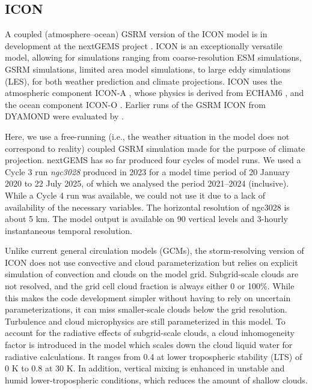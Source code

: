 \documentclass[12pt,a4paper]{article}
\begin{document}
\subsection{ICON}
\label{sec:icon}

A coupled (atmosphere--ocean) GSRM version of the ICON model is in development
at the nextGEMS project \citep{hohenegger2023}. ICON is an exceptionally
versatile model, allowing for simulations ranging from coarse-resolution ESM
simulations, GSRM simulations, limited area model simulations, to large eddy
simulations (LES), for both weather prediction and climate projections. ICON
uses the atmospheric component ICON-A \citep{giorgetta2018}, whose physics is
derived from ECHAM6 \citep{stevens2013}, and the ocean component ICON-O
\citep{korn2022}. Earlier runs of the GSRM ICON from DYAMOND were evaluated by
\cite{mauritsen2022}.

Here, we use a free-running (i.e., the weather situation in the model does not correspond to reality)
coupled GSRM simulation made for the purpose of climate projection.  nextGEMS
has so far produced four cycles of model runs. We used a Cycle 3 run
\emph{ngc3028} produced in 2023 \citep{nextgems2023a,nextgems2023b} for a model
time period of 20 January 2020 to 22 July 2025, of which we analysed the period 2021--2024 (inclusive). While a Cycle 4 run was available, we could not
use it due to a lack of availability of the necessary variables. The horizontal
resolution of ngc3028 is about 5 km.  The model output is available on 90
vertical levels and 3-hourly instantaneous temporal resolution.

Unlike current general circulation models (GCMs), the storm-resolving version
of ICON does not use convective and cloud parameterization but relies on
explicit simulation of convection and clouds on the model grid. Subgrid-scale
clouds are not resolved, and the grid cell cloud fraction is always either 0 or
100\%. While this makes the code development simpler without having to rely on
uncertain parameterizations, it can miss smaller-scale clouds below the grid
resolution.  Turbulence and cloud microphysics are still parameterized in this
model. To account for the radiative effects of subgrid-scale clouds, a cloud
inhomogeneity factor is introduced in the model which scales down the cloud
liquid water for radiative calculations. It ranges from 0.4 at lower
tropospheric stability (LTS) of 0 K to 0.8 at 30 K. In addition, vertical
mixing is enhanced in unstable and humid lower-tropospheric conditions, which
reduces the amount of shallow clouds.
\end{document}

